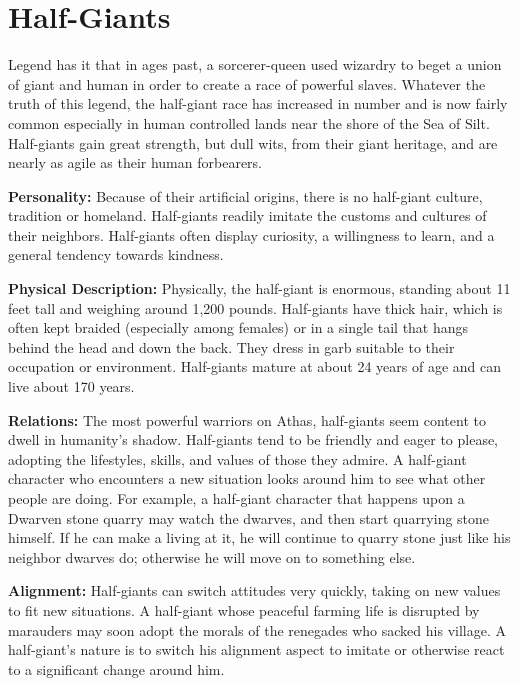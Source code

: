 \section{Half-Giants}

Legend has it that in ages past, a sorcerer-queen used wizardry to beget a union of giant and human in order to create a race of powerful slaves. Whatever the truth of this legend, the half-giant race has increased in number and is now fairly common especially in human controlled lands near the shore of the Sea of Silt. Half-giants gain great strength, but dull wits, from their giant heritage, and are nearly as agile as their human forbearers.

\textbf{Personality:} Because of their artificial origins, there is no half-giant culture, tradition or homeland. Half-giants readily imitate the customs and cultures of their neighbors. Half-giants often display curiosity, a willingness to learn, and a general tendency towards kindness.

\textbf{Physical Description:} Physically, the half-giant is enormous, standing about 11 \onehalf feet tall and weighing around 1,200 pounds. Half-giants have thick hair, which is often kept braided (especially among females) or in a single tail that hangs behind the head and down the back. They dress in garb suitable to their occupation or environment. Half-giants mature at about 24 years of age and can live about 170 years.

\textbf{Relations:} The most powerful warriors on Athas, half-giants seem content to dwell in humanity's shadow. Half-giants tend to be friendly and eager to please, adopting the lifestyles, skills, and values of those they admire. A half-giant character who encounters a new situation looks around him to see what other people are doing. For example, a half-giant character that happens upon a Dwarven stone quarry may watch the dwarves, and then start quarrying stone himself. If he can make a living at it, he will continue to quarry stone just like his neighbor dwarves do; otherwise he will move on to something else.

\textbf{Alignment:} Half-giants can switch attitudes very quickly, taking on new values to fit new situations. A half-giant whose peaceful farming life is disrupted by marauders may soon adopt the morals of the renegades who sacked his village. A half-giant's nature is to switch his alignment aspect to imitate or otherwise react to a significant change around him.

